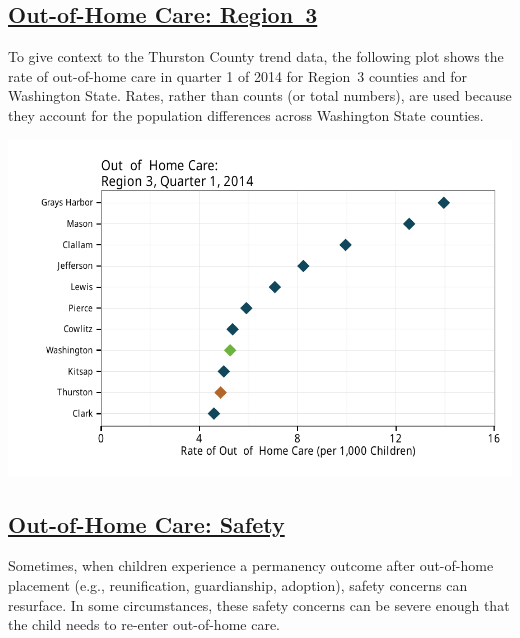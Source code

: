 \documentclass{article}\usepackage[]{graphicx}\usepackage[]{color}
\makeatletter
\def\maxwidth{ %
  \ifdim\Gin@nat@width>\linewidth
    \linewidth
  \else
    \Gin@nat@width
  \fi
}
\newenvironment{knitrout}{}{} %
\makeatother
\begin{document}
\begin{minipage}{\textwidth}
\subsection{\href{http://www.partnersforourchildren.org/data-portal/visualizations/out-home-care/trends}
    {Out-of-Home Care: Region~3}
}
To give context to the Thurston County trend data, the following plot shows the rate of out-of-home care in quarter 1 of 2014 for Region~3 counties and for Washington State. Rates, rather than counts (or total numbers), are used because they account for the population differences across Washington State counties.\\[1pt]
\begin{knitrout}
\color{fgcolor}

{\centering \includegraphics[width=\maxwidth]{figure/ooh_context-1} 

}



\end{knitrout}
\end{minipage}
\newpage

\subsection{\href{http://www.partnersforourchildren.org/data-portal/visualizations/out-home-care/safety}
    {Out-of-Home Care: Safety}
}

Sometimes, when children experience a permanency outcome after out-of-home placement (e.g., reunification, guardianship, adoption), safety concerns can resurface. In some circumstances, these safety concerns can be severe enough that the child needs to re-enter out-of-home care.
\end{document}

